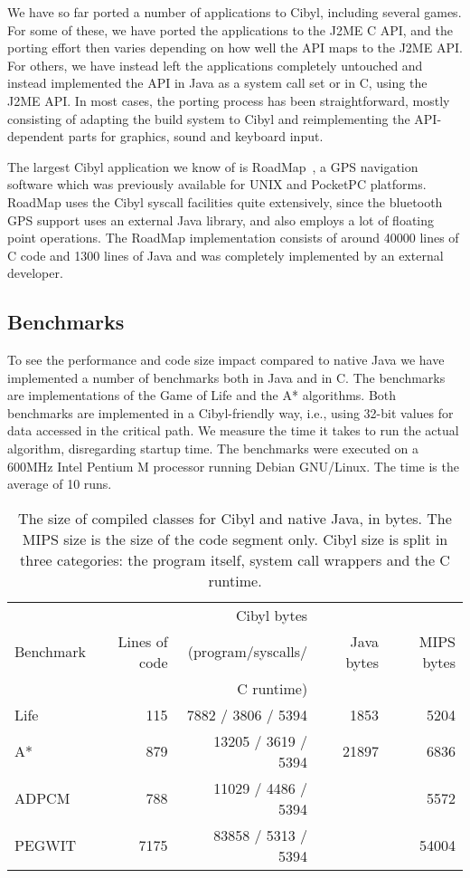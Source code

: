 We have so far ported a number of applications to Cibyl, including several
games. For some of these, we have ported the applications to the J2ME C API,
and the porting effort then varies depending on how well the API maps to the
J2ME API. For others, we have instead left the applications completely
untouched and instead implemented the API in Java as a system call set or in
C, using the J2ME API. In most cases, the porting process has been
straightforward, mostly consisting of adapting the build system to Cibyl and
reimplementing the API-dependent parts for graphics, sound and keyboard input.

The largest Cibyl application we know of is RoadMap~\cite{shabtai07roadmap}, a
GPS navigation software which was previously available for UNIX and PocketPC
platforms. RoadMap uses the Cibyl syscall facilities quite extensively, since
the bluetooth GPS support uses an external Java library, and also employs a
lot of floating point operations. The RoadMap implementation consists of
around 40000 lines of C code and 1300 lines of Java and was completely
implemented by an external developer.

\subsection{Benchmarks}
To see the performance and code size impact compared to native Java we have
implemented a number of benchmarks both in Java and in C. The benchmarks are
implementations of the Game of Life and the A* algorithms. Both benchmarks are
implemented in a Cibyl-friendly way, i.e., using 32-bit values for data
accessed in the critical path. We measure the time it takes to run the actual
algorithm, disregarding startup time. The benchmarks were executed on a 600MHz
Intel Pentium M processor running Debian GNU/Linux. The time is the average of
10 runs.

\begin{table*}[thb]
  \centering
  \caption[Class size for Cibyl and native Java]{The size of compiled classes for Cibyl and native Java, in bytes. The
    MIPS size is the size of the code segment only. Cibyl
    size is split in three categories: the program itself, system call wrappers and the C runtime.}
  \small
  \begin{tabular}{lrr|r|r}
  & & Cibyl bytes \\
  Benchmark  &  Lines of code & (program/syscalls/  & Java bytes & MIPS bytes \\
  & & C runtime)\\
  \hline
  Life       & 115            &  7882 / 3806 / 5394           & 1853       & 5204 \\
  A*         & 879            & 13205 / 3619 / 5394           & 21897      & 6836 \\
  \hline
  ADPCM      & 788            & 11029 / 4486 / 5394           &            & 5572 \\
  PEGWIT     & 7175           & 83858 / 5313 / 5394           &            & 54004 \\
\end{tabular}
\label{tab:size}
\end{table*}

